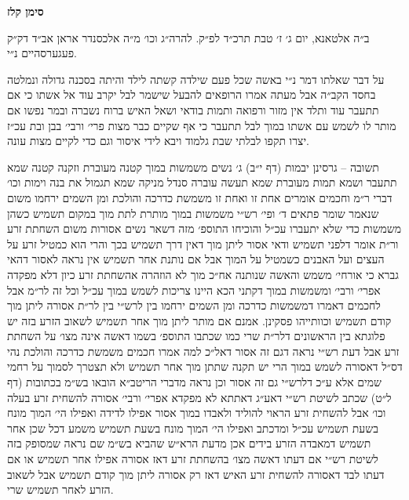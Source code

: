 \documentclass[12pt, openany]{book}
\newcommand{\chapname}{}
\newcommand{\newchap}[1]{
	\addcontentsline{toc}{chapter}{#1}
	\renewcommand{\chapname}{#1}
		\begin{center}
			\textbf{%
\fontsize{16pt}{16pt}\selectfont
				#1}
		\end{center}
}
\begin{document}
\newchap{סימן קלז}
\begin{multicols}{2}
ב״ה אלטאנא, יום ג׳ ז׳ טבת תרכ״ד לפ״ק. להרה״ג וכו׳ מ״ה אלכסנדר אראן אב״ד דק״ק פעגערסהיים נ״י.\\\vspace{0pt}

על דבר שאלתו דמר נ״י באשה שכל פעם שילדה קשתה לילד והיתה בסכנה גדולה ונמלטה בחסד הקב״ה אבל מעתה אמרו הרופאים להבעל שישמר לבל יקרב עוד אל אשתו כי אם תתעבר עוד ותלד אין מזור ורפואה ותמות בודאי ושאל האיש ברוח נשברה ובמר נפשו אם מותר לו לשמש עם אשתו במוך לבל תתעבר כי אף שקיים כבר מצות פרי׳ ורבי׳ בבן ובת עכ״ז יצרו תקפו לבלתי שבת גלמוד ויבא לידי איסור וגם כדי לקיים מצות עונה.\\\vspace{0pt}

תשובה – גרסינן יבמות (דף י״ב) ג׳ נשים משמשות במוך קטנה מעוברת וזקנה קטנה שמא תתעבר ושמא תמות מעוברת שמא תעשה עוברה סנדל מניקה שמא תגמול את בנה וימות וכו׳ דברי ר״מ וחכמים אומרים אחת זו ואחת זו משמשת כדרכה והולכת ומן השמים ירחמו משום שנאמר שומר פתאים ד׳ ופי׳ רש״י משמשות במוך מותרת לתת מוך במקום תשמיש כשהן משמשות כדי שלא יתעברו עכ״ל והוכיחו התוספ׳ מזה דשאר נשים אסורות משום השחתת זרע ור״ת אומר דלפני תשמיש ודאי אסור ליתן מוך דאין דרך תשמיש בכך והרי הוא כמטיל זרע על העצים ועל האבנים כשמטיל על המוך אבל אם נותנת אחר תשמיש אין נראה לאסור דהאי גברא כי אורחי׳ משמש והאשה שנותנה אח״כ מוך לא הוזהרה אהשחתת זרע כיון דלא מפקדה אפרי׳ ורבי׳ ומשמשות במוך דקתני הכא היינו צריכות לשמש במוך עכ״ל וכל זה לר״מ אבל לחכמים דאמרו דמשמשות כדרכה ומן השמים ירחמו בין לרש״י בין לר״ת אסורה ליתן מוך קודם תשמיש וכוותייהו פסקינן. אמנם אם מותר ליתן מוך אחר תשמיש לשאוב הזרע בזה יש פלוגתא בין הראשונים דלר״ת שרי כמו שכתבו התוספ׳ בשמו דאשה אינה מצו׳ על השחתת זרע אבל דעת רש״י נראה דגם זה אסור דאל״כ למה אמרו חכמים משמשת כדרכה והולכת נהי דס״ל דאסורה לשמש במוך הרי יש תקנה שתתן מוך אחר תשמיש ולא תצטרך לסמוך על רחמי שמים אלא ע״כ דלרש״י גם זה אסור וכן נראה מדברי הריטב״א הובאו בש״מ בכתובות (דף ל״ט) שכתב לשיטת רש״י דאע״ג דאתתא לא מפקדא אפרי׳ ורבי׳ אסורה להשחית זרע בעלה וכו׳ אבל להשחית זרע הראוי להוליד ולאבדו במוך אסור אפילו לדידה ואפילו הי׳ המוך מונח בשעת תשמיש עכ״ל ומדכתב ואפילו הי׳ המוך מונח בשעת תשמיש משמע דכל שכן אחר תשמיש דמאבדה הזרע בידים אכן מדעת הרא״ש שהביא בש״מ שם נראה שמסופק בזה לשיטת רש״י אם דעתו דאשה מצו׳ בהשחתת זרע דאז אסורה אפילו אחר תשמיש או אם דעתו לבד דאסורה להשחית זרע האיש דאז רק אסורה ליתן מוך קודם תשמיש אבל לשאוב הזרע לאחר תשמיש שרי.\\\vspace{0pt}


\end{multicols}
\end{document}
